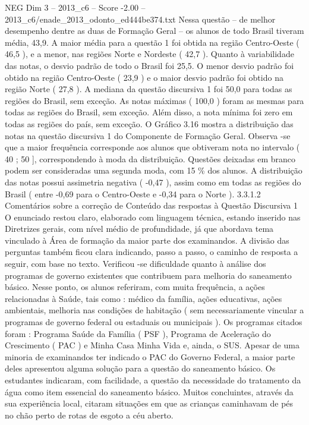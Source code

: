 \begin{textsample}{NEG Dim 3 – 2013\_c6 – Score -2.00 – 2013\_c6/enade\_2013\_odonto\_ed444be374.txt}
Nessa questão – de melhor desempenho dentre as duas de Formação Geral – os alunos de todo Brasil tiveram média, 43,9.
A maior média para a questão 1 foi obtida na região Centro-Oeste ( 46,5 ), e a menor, nas regiões Norte e Nordeste ( 42,7 ).
Quanto à variabilidade das notas, o desvio padrão de todo o Brasil foi 25,5.
O menor desvio padrão foi obtido na região Centro-Oeste ( 23,9 ) e o maior desvio padrão foi obtido na região Norte ( 27,8 ).
A mediana da questão discursiva 1 foi 50,0 para todas as regiões do Brasil, sem exceção.
As notas máximas ( 100,0 ) foram as mesmas para todas as regiões do Brasil, sem exceção.
Além disso, a nota mínima foi zero em todas as regiões do país, sem exceção.
O Gráfico 3.16 mostra a distribuição das notas na questão discursiva 1 do Componente de Formação Geral.
Observa -se que a maior frequência corresponde aos alunos que obtiveram nota no intervalo ( 40 ; 50 ], correspondendo à moda da distribuição.
Questões deixadas em branco podem ser consideradas uma segunda moda, com 15 \% dos alunos.
A distribuição das notas possui assimetria negativa ( -0,47 ), assim como em todas as regiões do Brasil ( entre -0,69 para o Centro-Oeste e -0,34 para o Norte ). 3.3.1.2 Comentários sobre a correção de Conteúdo das respostas à Questão Discursiva 1 O enunciado restou claro, elaborado com linguagem técnica, estando inserido nas Diretrizes gerais, com nível médio de profundidade, já que abordava tema vinculado à Área de formação da maior parte dos examinandos.
A divisão das perguntas também ficou clara indicando, passo a passo, o caminho de resposta a seguir, com base no texto.
Verificou -se dificuldade quanto à análise dos programas de governo existentes que contribuem para melhoria do saneamento básico.
Nesse ponto, os alunos referiram, com muita frequência, a ações relacionadas à Saúde, tais como : médico da família, ações educativas, ações ambientais, melhoria nas condições de habitação ( sem necessariamente vincular a programas de governo federal ou estaduais ou municipais ).
Os programas citados foram : Programa Saúde da Família ( PSF ), Programa de Aceleração do Crescimento ( PAC ) e Minha Casa Minha Vida e, ainda, o SUS.
Apesar de uma minoria de examinandos ter indicado o PAC do Governo Federal, a maior parte deles apresentou alguma solução para a questão do saneamento básico.
Os estudantes indicaram, com facilidade, a questão da necessidade do tratamento da água como item essencial do saneamento básico.
Muitos concluintes, através da sua experiência local, citaram situações em que as crianças caminhavam de pés no chão perto de rotas de esgoto a céu aberto.

\end{textsample}
